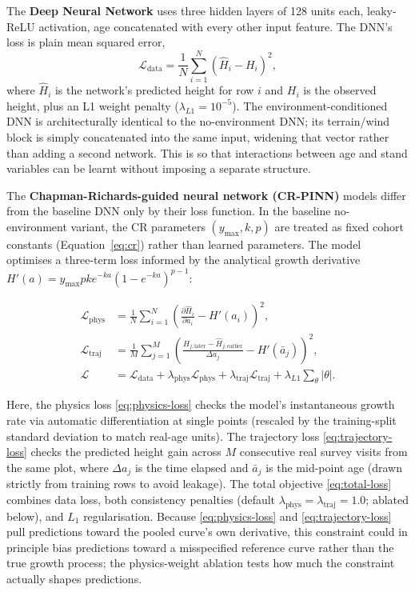 The \textbf{Deep Neural Network} uses three hidden layers of 128 units each, leaky-ReLU activation, age concatenated with every other
input feature. The DNN's loss is plain mean squared error,
\begin{equation}
\mathcal{L}_{\text{data}} = \frac{1}{N}\sum_{i=1}^{N}\left(\hat H_i - H_i\right)^2,
\label{eq:data-loss}
\end{equation}
where $\hat H_i$ is the network's predicted height for row $i$ and $H_i$ is the observed height,
plus an L1 weight penalty ($\lambda_{L1}=10^{-5}$). The environment-conditioned DNN is
architecturally identical to the no-environment DNN; its terrain/wind block is simply concatenated
into the same input, widening that vector rather than adding a second network. This is so that interactions between age and stand variables can be learnt without imposing a separate structure.

The \textbf{Chapman-Richards-guided neural network (CR-PINN)} models differ from the baseline DNN only by their loss function. In the baseline no-environment variant, the CR parameters $(y_{\max}, k, p)$ are treated as fixed cohort constants (Equation~\ref{eq:cr}) rather than learned parameters. The model optimises a three-term loss informed by the analytical growth derivative $H'(a) = y_{\max} p k e^{-ka}(1 - e^{-ka})^{p-1}$:

\begin{subequations}
\label{eq:cr-pinn-losses}
\begin{align}
\mathcal{L}_{\text{phys}} &= \frac{1}{N}\sum_{i=1}^{N}\left(\frac{\partial \hat{H}_i}{\partial a_i} - H'(a_i)\right)^2, \label{eq:physics-loss} \\
\mathcal{L}_{\text{traj}} &= \frac{1}{M}\sum_{j=1}^{M}\left(\frac{\hat{H}_{j,\text{later}} - \hat{H}_{j,\text{earlier}}}{\Delta a_j} - H'(\bar{a}_j)\right)^2, \label{eq:trajectory-loss} \\
\mathcal{L} &= \mathcal{L}_{\text{data}} + \lambda_{\text{phys}}\mathcal{L}_{\text{phys}} + \lambda_{\text{traj}}\mathcal{L}_{\text{traj}} + \lambda_{L1}\sum_{\theta}|\theta|. \label{eq:total-loss}
\end{align}
\end{subequations}

Here, the physics loss \eqref{eq:physics-loss} checks the model's instantaneous growth rate via automatic differentiation at single points (rescaled by the training-split standard deviation to match real-age units). The trajectory loss \eqref{eq:trajectory-loss} checks the predicted height gain across $M$ consecutive real survey visits from the same plot, where $\Delta a_j$ is the time elapsed and $\bar{a}_j$ is the mid-point age (drawn strictly from training rows to avoid leakage). The total objective \eqref{eq:total-loss} combines data loss, both consistency penalties (default $\lambda_{\text{phys}}=\lambda_{\text{traj}}=1.0$; ablated below), and $L_1$ regularisation. Because \eqref{eq:physics-loss} and \eqref{eq:trajectory-loss} pull predictions toward the pooled curve's own derivative, this constraint could in principle bias predictions toward a misspecified reference curve rather than the true growth process; the physics-weight ablation tests how much the constraint actually shapes predictions. 

